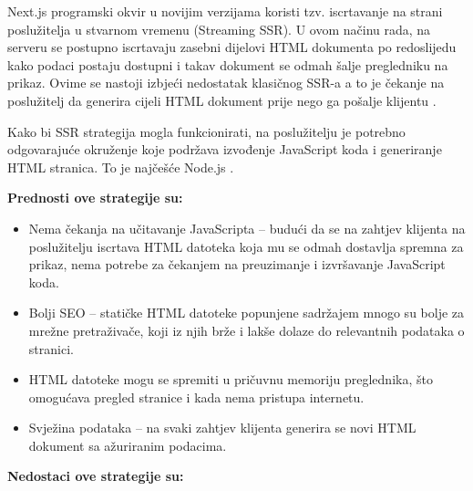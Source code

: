 \bigskip

Next.js programski okvir u novijim verzijama koristi tzv. iscrtavanje na strani poslužitelja u stvarnom vremenu (Streaming SSR). U ovom načinu rada, na serveru se postupno iscrtavaju zasebni dijelovi HTML dokumenta po redoslijedu kako podaci postaju dostupni i takav dokument se odmah šalje pregledniku na prikaz. Ovime se nastoji izbjeći nedostatak klasičnog SSR-a a to je čekanje na poslužitelj da generira cijeli HTML dokument prije nego ga pošalje klijentu \cite{nextjsloading}.

\bigskip

Kako bi SSR strategija mogla funkcionirati, na poslužitelju je potrebno odgovarajuće okruženje koje podržava izvođenje JavaScript koda i generiranje HTML stranica. To je najčešće Node.js \cite{vuejsssr}.

\bigskip

\textbf{Prednosti ove strategije su:}

\begin{itemize}
    \item Nema čekanja na učitavanje JavaScripta – budući da se na zahtjev klijenta na poslužitelju iscrtava HTML datoteka koja mu se odmah dostavlja spremna za prikaz, nema potrebe za čekanjem na preuzimanje i izvršavanje JavaScript koda.
    \item Bolji SEO – statičke HTML datoteke popunjene sadržajem mnogo su bolje za mrežne pretraživače, koji iz njih brže i lakše dolaze do relevantnih podataka o stranici.
    \item HTML datoteke mogu se spremiti u pričuvnu memoriju preglednika, što omogućava pregled stranice i kada nema pristupa internetu.
    \item Svježina podataka – na svaki zahtjev klijenta generira se novi HTML dokument sa ažuriranim podacima.
\end{itemize}

\bigskip

\textbf{Nedostaci ove strategije su:}

